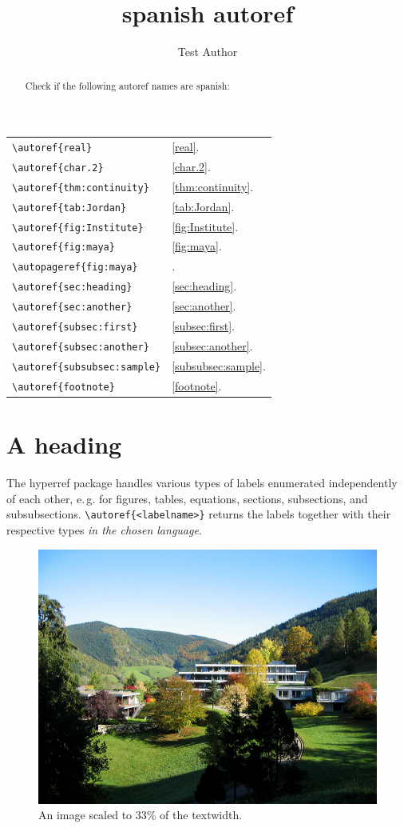 \documentclass{snapshotmfo}
\author{Test Author}
\title{spanish autoref}
\begin{document}
\begin{abstract}
Check if the following autoref names are spanish:
\end{abstract}

\noindent\begin{tabular}{@{}l@{\quad yields\quad}l@{}}
\verb+\autoref{real}+             &\autoref{real}.\\
\verb+\autoref{char.2}+           &\autoref{char.2}.\\
\verb+\autoref{thm:continuity}+   &\autoref{thm:continuity}.\\
\verb+\autoref{tab:Jordan}+       &\autoref{tab:Jordan}.\\
\verb+\autoref{fig:Institute}+    &\autoref{fig:Institute}.\\
\verb+\autoref{fig:maya}+         &\autoref{fig:maya}.\\
\verb+\autopageref{fig:maya}+     &\autopageref{fig:maya}.\\
\verb+\autoref{sec:heading}+      &\autoref{sec:heading}.\\
\verb+\autoref{sec:another}+      &\autoref{sec:another}.\\
\verb+\autoref{subsec:first}+     &\autoref{subsec:first}.\\
\verb+\autoref{subsec:another}+   &\autoref{subsec:another}.\\
\verb+\autoref{subsubsec:sample}+ &\autoref{subsubsec:sample}.\\
\verb+\autoref{footnote}+         &\autoref{footnote}.\\
\end{tabular}


\section{A heading}
\label{sec:heading}
The hyperref package handles various types of labels enumerated independently of each other, e.\,g.
for figures, tables, equations, sections, subsections, and subsubsections.
\verb+\autoref{<labelname>}+ returns the labels together with their respective types {\em in the chosen language}.

\begin{figure}[ht]
        \centering 
        \includegraphics[width= 0.33 \textwidth]{mfo.jpg}
        \caption{An image scaled to 33\% of the textwidth.}
\label{fig:Institute}
\end{figure}
\end{document}
